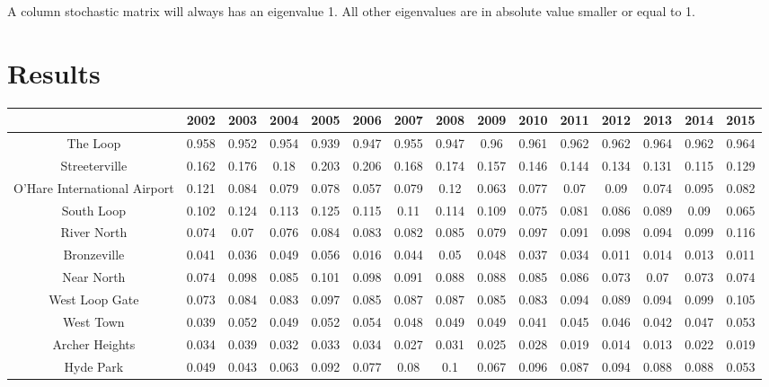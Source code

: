 \documentclass{article}
\begin{document}
A column stochastic matrix will always has an eigenvalue 1. All other eigenvalues are in absolute
value smaller or equal to 1.\\ 

\section{Results}

\begin{adjustbox}{center}

 \begin{tabular}{||c | c c c c c c c c c c c c c c ||} 
 \hline
 & 2002 & 2003 & 2004 & 2005 & 2006 & 2007 & 2008 & 2009 & 2010 & 2011 & 2012 & 2013 & 2014 & 2015\\[0.5ex] 
 \hline\hline
The Loop & 0.958 & 0.952 & 0.954 & 0.939 & 0.947 & 0.955 & 0.947 & 0.96 & 0.961 & 0.962 & 0.962 & 0.964 & 0.962 & 0.964 \\

Streeterville & 0.162 & 0.176 & 0.18 & 0.203 & 0.206 & 0.168 & 0.174 & 0.157 & 0.146 & 0.144 & 0.134 & 0.131 & 0.115 & 0.129 \\

O'Hare International Airport & 0.121 & 0.084 & 0.079 & 0.078 & 0.057 & 0.079 & 0.12 & 0.063 & 0.077 & 0.07 & 0.09 & 0.074 & 0.095 & 0.082 \\

South Loop & 0.102 & 0.124 & 0.113 & 0.125 & 0.115 & 0.11 & 0.114 & 0.109 & 0.075 & 0.081 & 0.086 & 0.089 & 0.09 & 0.065 \\

River North & 0.074 & 0.07 & 0.076 & 0.084 & 0.083 & 0.082 & 0.085 & 0.079 & 0.097 & 0.091 & 0.098 & 0.094 & 0.099 & 0.116 \\

Bronzeville & 0.041 & 0.036 & 0.049 & 0.056 & 0.016 & 0.044 & 0.05 & 0.048 & 0.037 & 0.034 & 0.011 & 0.014 & 0.013 & 0.011 \\

Near North & 0.074 & 0.098 & 0.085 & 0.101 & 0.098 & 0.091 & 0.088 & 0.088 & 0.085 & 0.086 & 0.073 & 0.07 & 0.073 & 0.074 \\

West Loop Gate & 0.073 & 0.084 & 0.083 & 0.097 & 0.085 & 0.087 & 0.087 & 0.085 & 0.083 & 0.094 & 0.089 & 0.094 & 0.099 & 0.105 \\

West Town & 0.039 & 0.052 & 0.049 & 0.052 & 0.054 & 0.048 & 0.049 & 0.049 & 0.041 & 0.045 & 0.046 & 0.042 & 0.047 & 0.053 \\

Archer Heights & 0.034 & 0.039 & 0.032 & 0.033 & 0.034 & 0.027 & 0.031 & 0.025 & 0.028 & 0.019 & 0.014 & 0.013 & 0.022 & 0.019  \\

Hyde Park & 0.049 & 0.043 & 0.063 & 0.092 & 0.077 & 0.08 & 0.1 & 0.067 & 0.096 & 0.087 & 0.094 & 0.088 & 0.088 & 0.053  \\
 \hline
 \end{tabular}
\end{adjustbox}
\end{document}

